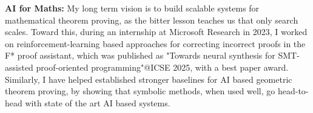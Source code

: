 \documentclass[11pt,a4paper,sans,colorlinks]{moderncv}        %
\begin{document}
\textbf{AI for Maths:} My long term vision is to build scalable systems for mathematical theorem proving, as the bitter lesson teaches us that only search scales. Toward this, during an internship at Microsoft Research in 2023, I worked on reinforcement-learning based approaches for correcting incorrect proofs in the F* proof assistant, which was published as "Towards neural synthesis for SMT-assisted proof-oriented programming"@ICSE 2025, with a best paper award. Similarly, I have helped established stronger baselines for AI based geometric theorem proving, by showing that symbolic methods, when used well, go head-to-head with state of the art AI based systems.


% 
% 
% 
% 
% 
% 
% 
% 
% 
% 
\end{document}
